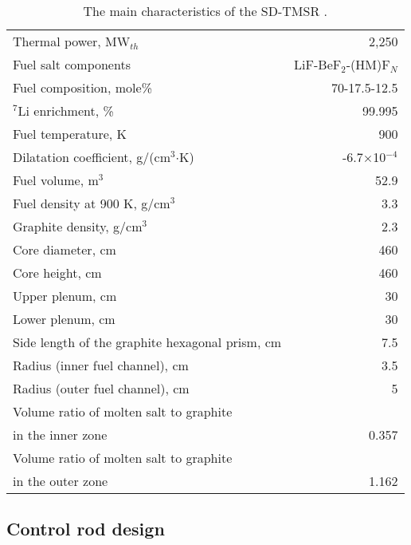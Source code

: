 \begin{table}  %
	\caption{The main characteristics of the SD-TMSR \cite{li_optimization_2018,ashraf2020thermal}.}
	\vspace{0.1in}
	\begin{tabularx}{\textwidth}{l | r}
		\hline
		Thermal power, MW$_{th}$          				&  2,250  \\ 
		Fuel salt components                            & LiF-BeF$_2$-(\gls{HM})F$_N$ \\
		Fuel composition, mole\%                        & 70-17.5-12.5    \\
		$^7$Li enrichment, \%        				& 99.995   \\
		Fuel temperature, K 							& 900  \\
		Dilatation coefficient, g/(cm$^3$$\cdot{}$K)  &  -6.7$\times$10$^{-4}$ \\ 
		Fuel volume, m$^3$  &	52.9 \\
		Fuel density at 900 K, g/cm$^3$		  		& 3.3 \\
		Graphite density, g/cm$^3$             	    & 2.3	\\ 
		Core diameter, cm								& 460  \\
		Core height, cm									& 460  \\
		Upper plenum, cm								& 30  \\
		Lower plenum, cm								& 30  \\
		Side length of the graphite hexagonal prism, cm   & 7.5 \\
		Radius (inner fuel channel), cm							& 3.5  \\
		Radius (outer fuel channel), cm							& 5  \\
		Volume ratio of molten salt to graphite \\in the inner zone	&  0.357  \\
		Volume ratio of molten salt to graphite \\in the outer zone &  1.162  \\
		
		\hline
	\end{tabularx}
	\label{tab:table1}
\end{table}

\subsection{Control rod design} \label{CRD}


